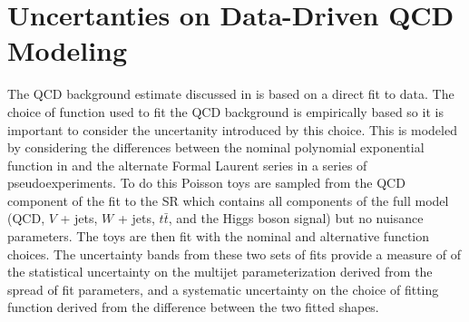 \section{Uncertanties on Data-Driven QCD Modeling} \label{sec:systematics:qcd_modeling}

The QCD background estimate discussed in  is based on
a direct fit to data. The choice of function used to fit the QCD background is
empirically based so it is important to consider the uncertanity introduced by
this choice.  This is modeled by considering the differences between the
nominal polynomial exponential function in  and
the alternate Formal Laurent series  in a series
of pseudoexperiments.  To do this Poisson toys are sampled from the QCD
component of the fit to the SR which contains all components of the full model
(QCD, $V$ + jets, $W$ + jets, $t\bar{t}$, and the Higgs boson signal) but no
nuisance parameters. The toys are then fit with the nominal and alternative
function choices.  The uncertainty bands from these two sets of fits provide a
measure of of the statistical uncertainty on the multijet parameterization
derived from the spread of fit parameters, and a systematic uncertainty on the
choice of fitting function derived from the difference between the two fitted
shapes.
